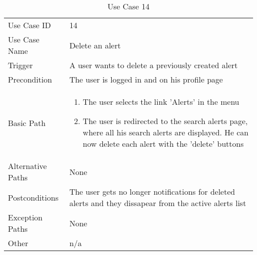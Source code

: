\begin{table}[H]
\centering
\label{table-use-case-14}
\begin{tabular}{|p{3cm}|p{10cm}}
Use Case ID       & 14                                                         \\
Use Case Name     & Delete an alert                                      \\
Trigger           & A user wants to delete a previously created alert	\\
Precondition      & The user is logged in and on his profile page               \\
Basic Path        & \begin{enumerate}
\item The user selects the link 'Alerts' in the menu
\item The user is redirected to the search alerts page, where all his search
alerts are displayed. He can now delete each alert with the 'delete' buttons
\end{enumerate} 
     \\
Alternative Paths & None                          \\
Postconditions    & The user gets no longer notifications for deleted alerts and they dissapear from the active alerts list    \\
Exception Paths   & None			\\
Other             & n/a                                                                                                                                                                                                        
\end{tabular}
\caption{Use Case 14}
\end{table}


